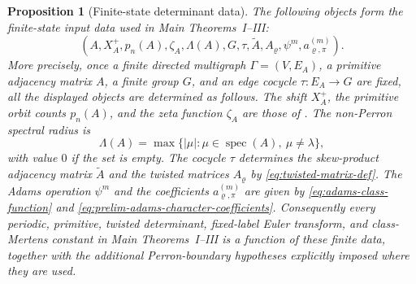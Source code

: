 \documentclass[11pt,a4paper]{amsart}
\theoremstyle{plain}
\newtheorem{proposition}[theorem]{Proposition}
\theoremstyle{definition}
\theoremstyle{remark}
\DeclareMathOperator{\spec}{spec}
\begin{document}
\begin{proposition}[Finite-state determinant data]
  \label{prop:finite-state-data-collection}
  \label{prop:finite-state-data-package}
The following objects form the finite-state input data used in
  Main Theorems~I--III:
  \[
    (A,X_A^+,p_n(A),\zeta_A,\Lambda(A),G,\tau,
      \widetilde A,A_\varrho,\psi^m,a_{\varrho,
      \pi}^{(m)}) .
  \]
  More precisely, once a finite directed multigraph \(\Gamma=(V,E_A)\),
  a primitive adjacency matrix \(A\), a finite group \(G\), and an edge
  cocycle \(\tau:E_A\to G\) are fixed, all the displayed objects are
  determined as follows. The shift \(X_A^+\), the primitive orbit counts
  \(p_n(A)\), and the zeta function \(\zeta_A\) are those of
  . The non-Perron spectral radius is
  \[
    \Lambda(A)=\max\{|\mu|:\mu\in\spec(A),\ \mu\neq\lambda\},
  \]
  with value \(0\) if the set is empty. The cocycle \(\tau\) determines
  the skew-product adjacency matrix \(\widetilde A\) and the twisted
  matrices \(A_\varrho\) by \eqref{eq:twisted-matrix-def}. The Adams
  operation \(\psi^m\) and the coefficients
  \(a_{\varrho,\pi}^{(m)}\) are given by
  \eqref{eq:adams-class-function} and
  \eqref{eq:prelim-adams-character-coefficients}. Consequently every
  periodic, primitive, twisted determinant, fixed-label Euler transform,
and class-Mertens constant in Main Theorems~I--III is a function of
these finite data, together with the additional Perron-boundary
  hypotheses explicitly imposed where they are used.
\end{proposition}
\end{document}
